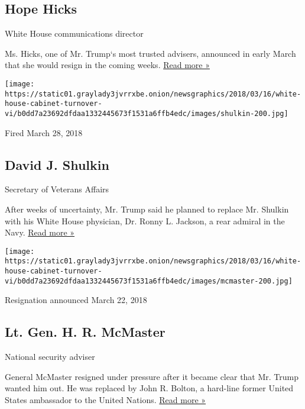 \hypertarget{hope-hicks}{%
\subsection{Hope Hicks}\label{hope-hicks}}

White House communications director

Ms. Hicks, one of Mr. Trump`s most trusted advisers, announced in early
March that she would resign in the coming weeks.
\href{https://www.nytimes3xbfgragh.onion/2018/02/28/us/politics/hope-hicks-resign-communications-director.html}{Read
more »}

\texttt{[image: https://static01.graylady3jvrrxbe.onion/newsgraphics/2018/03/16/white-house-cabinet-turnover-vi/b0dd7a23692dfdaa1332445673f1531a6ffb4edc/images/shulkin-200.jpg]}

Fired March 28, 2018

\hypertarget{david-j-shulkin}{%
\subsection{David J. Shulkin}\label{david-j-shulkin}}

Secretary of Veterans Affairs

After weeks of uncertainty, Mr. Trump said he planned to replace Mr.
Shulkin with his White House physician, Dr. Ronny L. Jackson, a rear
admiral in the Navy.
\href{https://www.nytimes3xbfgragh.onion/2018/03/28/us/politics/david-shulkin-veterans-affairs-trump.html}{Read
more »}

\texttt{[image: https://static01.graylady3jvrrxbe.onion/newsgraphics/2018/03/16/white-house-cabinet-turnover-vi/b0dd7a23692dfdaa1332445673f1531a6ffb4edc/images/mcmaster-200.jpg]}

Resignation announced March 22, 2018

\hypertarget{lt-gen-h-r-mcmaster}{%
\subsection{Lt. Gen. H. R. McMaster}\label{lt-gen-h-r-mcmaster}}

National security adviser

General McMaster resigned under pressure after it became clear that Mr.
Trump wanted him out. He was replaced by John R. Bolton, a hard-line
former United States ambassador to the United Nations.
\href{https://www.nytimes3xbfgragh.onion/2018/03/22/us/politics/hr-mcmaster-trump-bolton.html}{Read
more »}

